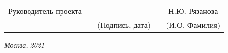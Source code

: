 \vspace{0.5cm}

\noindent
\begin{tabular}{l c c c c}
    Руководитель проекта & \hspace{3.3cm}   & \hspace{3.5cm}              & & Н.Ю. Рязанова \\\cline{3-3} \cline{5-5} 
    \hspace{3cm}  &                & {\footnotesize(Подпись, дата)} & & {\footnotesize(И.О. Фамилия)}
\end{tabular}

\begin{center}	
	\vfill
	\large \textit {Москва, 2021}
\end{center}

\thispagestyle {empty}
\pagebreak